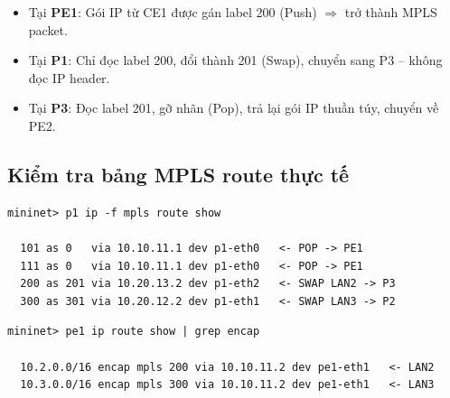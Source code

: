 \begin{itemize}
    \item Tại \textbf{PE1}: Gói IP từ CE1 được gán label 200 (Push) $\Rightarrow$ trở thành MPLS packet.
    \item Tại \textbf{P1}: Chỉ đọc label 200, đổi thành 201 (Swap), chuyển sang P3 -- không đọc IP header.
    \item Tại \textbf{P3}: Đọc label 201, gỡ nhãn (Pop), trả lại gói IP thuần túy, chuyển về PE2.
\end{itemize}

\subsection{Kiểm tra bảng MPLS route thực tế}

\begin{lstlisting}[style=termstyle, caption={Bảng MPLS route tại P1 (ip -f mpls route show)}]
mininet> p1 ip -f mpls route show

  101 as 0   via 10.10.11.1 dev p1-eth0   <- POP -> PE1
  111 as 0   via 10.10.11.1 dev p1-eth0   <- POP -> PE1
  200 as 201 via 10.20.13.2 dev p1-eth2   <- SWAP LAN2 -> P3
  300 as 301 via 10.20.12.2 dev p1-eth1   <- SWAP LAN3 -> P2
\end{lstlisting}

\begin{lstlisting}[style=termstyle, caption={IP route có encap MPLS tại PE1}]
mininet> pe1 ip route show | grep encap

  10.2.0.0/16 encap mpls 200 via 10.10.11.2 dev pe1-eth1   <- LAN2
  10.3.0.0/16 encap mpls 300 via 10.10.11.2 dev pe1-eth1   <- LAN3
\end{lstlisting}
